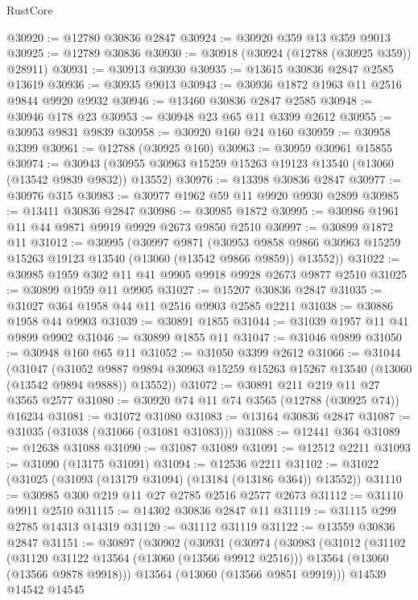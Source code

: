 \begin{lexlean}{RustCore}
\begin{coremodule}
@30920 := @12780 @30836 @2847
@30924 := @30920 @359 @13 @359 @9013
@30925 := @12789 @30836
@30930 := @30918 (@30924 (@12788 (@30925 @359)) @28911)
@30931 := @30913 @30930
@30935 := @13615 @30836 @2847 @2585 @13619
@30936 := @30935 @9013
@30943 := @30936 @1872 @1963 @11 @2516 @9844 @9920 @9932
@30946 := @13460 @30836 @2847 @2585
@30948 := @30946 @178 @23
@30953 := @30948 @23 @65 @11 @3399 @2612
@30955 := @30953 @9831 @9839
@30958 := @30920 @160 @24 @160
@30959 := @30958 @3399
@30961 := @12788 (@30925 @160)
@30963 := @30959 @30961 @15855
@30974 := @30943 (@30955 @30963 @15259 @15263 @19123 @13540 (@13060 (@13542 @9839 @9832)) @13552)
@30976 := @13398 @30836 @2847
@30977 := @30976 @315
@30983 := @30977 @1962 @59 @11 @9920 @9930 @2899
@30985 := @13411 @30836 @2847
@30986 := @30985 @1872
@30995 := @30986 @1961 @11 @44 @9871 @9919 @9929 @2673 @9850 @2510
@30997 := @30899 @1872 @11
@31012 := @30995
    (@30997
      @9871
      (@30953 @9858 @9866 @30963 @15259 @15263 @19123 @13540 (@13060 (@13542 @9866 @9859)) @13552))
@31022 := @30985 @1959 @302 @11 @41 @9905 @9918 @9928 @2673 @9877 @2510
@31025 := @30899 @1959 @11 @9905
@31027 := @15207 @30836 @2847
@31035 := @31027 @364 @1958 @44 @11 @2516 @9903 @2585 @2211
@31038 := @30886 @1958 @44 @9903
@31039 := @30891 @1855
@31044 := @31039 @1957 @11 @41 @9899 @9902
@31046 := @30899 @1855 @11
@31047 := @31046 @9899
@31050 := @30948 @160 @65 @11
@31052 := @31050 @3399 @2612
@31066 := @31044
    (@31047
      (@31052 @9887 @9894 @30963 @15259 @15263 @15267 @13540 (@13060 (@13542 @9894 @9888)) @13552))
@31072 := @30891 @211 @219 @11 @27 @3565 @2577
@31080 := @30920 @74 @11 @74 @3565 (@12788 (@30925 @74)) @16234
@31081 := @31072 @31080
@31083 := @13164 @30836 @2847
@31087 := @31035 (@31038 (@31066 (@31081 @31083)))
@31088 := @12441 @364
@31089 := @12638 @31088
@31090 := @31087 @31089
@31091 := @12512 @2211
@31093 := @31090 (@13175 @31091)
@31094 := @12536 @2211
@31102 := @31022 (@31025 (@31093 (@13179 @31094) (@13184 (@13186 @364)) @13552))
@31110 := @30985 @300 @219 @11 @27 @2785 @2516 @2577 @2673
@31112 := @31110 @9911 @2510
@31115 := @14302 @30836 @2847 @11
@31119 := @31115 @299 @2785 @14313 @14319
@31120 := @31112 @31119
@31122 := @13559 @30836 @2847
@31151 := @30897
    (@30902
      (@30931
        (@30974
          (@30983
            (@31012
              (@31102
                (@31120 @31122 @13564 (@13060 (@13566 @9912 @2516)))
                @13564
                (@13060 (@13566 @9878 @9918)))
              @13564
              (@13060 (@13566 @9851 @9919)))
            @14539
            @14542
            @14545

\end{coremodule}
\end{lexlean}
